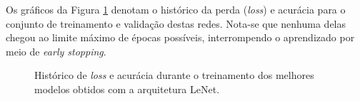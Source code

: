 Os gráficos da Figura \ref{fig:treinamento-lenet} denotam o histórico da perda (\emph{loss}) e acurácia para o conjunto de treinamento e validação destas redes. Nota-se que nenhuma delas chegou ao limite máximo de épocas possíveis, interrompendo o aprendizado por meio de \emph{early stopping}.

\begin{figure}[H]
	\centering
	\caption{Histórico de \emph{loss} e acurácia durante o treinamento dos melhores modelos obtidos com a arquitetura LeNet.}
	\hfill
	\label{fig:treinamento-lenet}
\end{figure}

